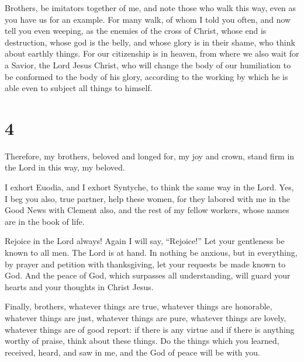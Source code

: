  Brothers, be imitators together of me, and note those who
walk this way, even as you have us for an example.  For
many walk, of whom I told you often, and now tell you even weeping, as
the enemies of the cross of Christ,  whose end is
destruction, whose god is the belly, and whose glory is in their shame,
who think about earthly things.  For our citizenship is in
heaven, from where we also wait for a Savior, the Lord Jesus Christ,
 who will change the body of our humiliation to be
conformed to the body of his glory, according to the working by which he
is able even to subject all things to himself.

\hypertarget{section-3}{%
\section{4}\label{section-3}}

 Therefore, my brothers, beloved and longed for, my joy and
crown, stand firm in the Lord in this way, my beloved.

 I exhort Euodia, and I exhort Syntyche, to think the same
way in the Lord.  Yes, I beg you also, true partner, help
these women, for they labored with me in the Good News with Clement
also, and the rest of my fellow workers, whose names are in the book of
life.

 Rejoice in the Lord always! Again I will say, ``Rejoice!''
 Let your gentleness be known to all men. The Lord is at
hand.  In nothing be anxious, but in everything, by prayer
and petition with thanksgiving, let your requests be made known to God.
 And the peace of God, which surpasses all understanding,
will guard your hearts and your thoughts in Christ Jesus.

 Finally, brothers, whatever things are true, whatever
things are honorable, whatever things are just, whatever things are
pure, whatever things are lovely, whatever things are of good report: if
there is any virtue and if there is anything worthy of praise, think
about these things.  Do the things which you learned,
received, heard, and saw in me, and the God of peace will be with you.

